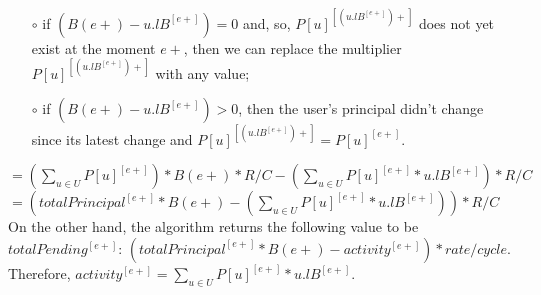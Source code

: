 \documentclass{article}
\begin{document}
\begin{itemize}
\begin{itemize}
\begin{itemize}
      \item[$\circ$] if $(B(e+) - u.lB^{[e+]}) = 0$ and, so, $P[u]^{[(u.lB^{[e+]})+]}$ 
      does not yet exist at the moment $e+$, then we can replace the multiplier 
      $P[u]^{[(u.lB^{[e+]})+]}$ with any value; \newline

      \item[$\circ$] if $(B(e+) - u.lB^{[e+]}) > 0$, then the user's principal didn't change 
      since its latest change and 
      \newline \newline
      $P[u]^{[(u.lB^{[e+]})+]} = P[u]^{[e+]}$. \newline
    \end{itemize}

    $ = ( \sum_{u \in U} P[u]^{[e+]} ) * B(e+) * R / C 
    - ( \sum_{u \in U} P[u]^{[e+]} * u.lB^{[e+]} ) * R / C $
    \newline \newline
    $ = (totalPrincipal^{[e+]} * B(e+) - ( \sum_{u \in U} P[u]^{[e+]} * u.lB^{[e+]} )) * R / C $
    \newline \newline
    On the other hand, the algorithm returns the following value to be $ totalPending^{[e+]} $:
    \newline \newline
    $ ( totalPrincipal^{[e+]} * B(e+) - activity^{[e+]} ) * rate / cycle $.
    \newline \newline
    Therefore, $ activity^{[e+]} = \sum_{u \in U} P[u]^{[e+]} * u.lB^{[e+]}$.
    \newline


\end{itemize}
\end{itemize}
\end{document}

